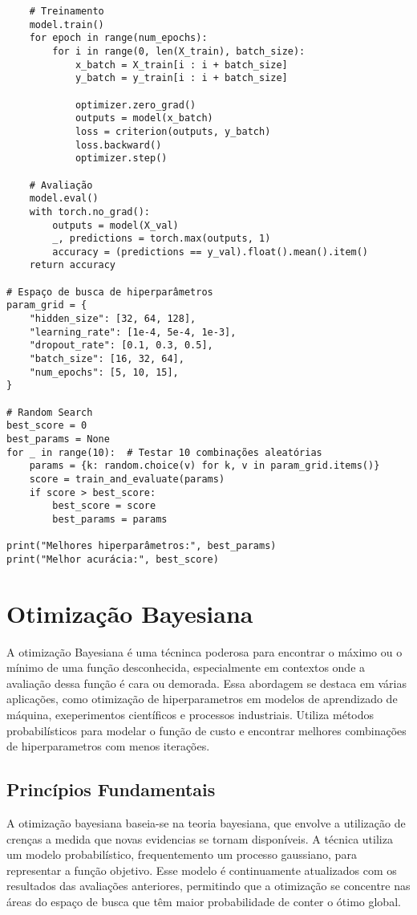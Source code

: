 \documentclass{article}
\begin{document}
\begin{verbatim}
    # Treinamento
    model.train()
    for epoch in range(num_epochs):
        for i in range(0, len(X_train), batch_size):
            x_batch = X_train[i : i + batch_size]
            y_batch = y_train[i : i + batch_size]

            optimizer.zero_grad()
            outputs = model(x_batch)
            loss = criterion(outputs, y_batch)
            loss.backward()
            optimizer.step()

    # Avaliação
    model.eval()
    with torch.no_grad():
        outputs = model(X_val)
        _, predictions = torch.max(outputs, 1)
        accuracy = (predictions == y_val).float().mean().item()
    return accuracy

# Espaço de busca de hiperparâmetros
param_grid = {
    "hidden_size": [32, 64, 128],
    "learning_rate": [1e-4, 5e-4, 1e-3],
    "dropout_rate": [0.1, 0.3, 0.5],
    "batch_size": [16, 32, 64],
    "num_epochs": [5, 10, 15],
}

# Random Search
best_score = 0
best_params = None
for _ in range(10):  # Testar 10 combinações aleatórias
    params = {k: random.choice(v) for k, v in param_grid.items()}
    score = train_and_evaluate(params)
    if score > best_score:
        best_score = score
        best_params = params

print("Melhores hiperparâmetros:", best_params)
print("Melhor acurácia:", best_score)
\end{verbatim}
\section{Otimização Bayesiana}
A otimização Bayesiana é uma técninca poderosa para encontrar o máximo ou o mínimo de uma função desconhecida, especialmente em contextos onde a avaliação dessa função é cara ou demorada. Essa abordagem se destaca em várias aplicações, como otimização de hiperparametros em modelos de aprendizado de máquina, exeperimentos científicos e processos industriais. Utiliza métodos probabilísticos para modelar o função de custo e encontrar melhores combinações de hiperparametros com menos iterações.
\subsection{Princípios Fundamentais}
A otimização bayesiana baseia-se na teoria bayesiana, que envolve a utilização de crenças a medida que novas evidencias se tornam disponíveis. A técnica utiliza um modelo probabilístico, frequentemento um processo gaussiano, para representar a função objetivo. Esse modelo é continuamente atualizados com os resultados das avaliações anteriores, permitindo que a otimização se concentre nas áreas do espaço de busca que têm maior probabilidade de conter o ótimo global. 
\end{document}
